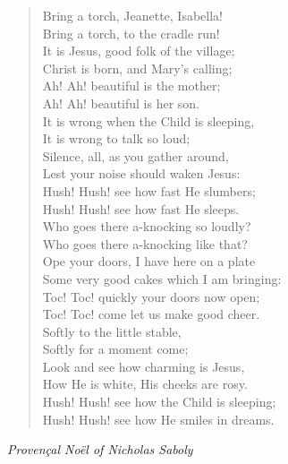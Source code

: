 
\begin{verse}
Bring a torch, Jeanette, Isabella!\\
Bring a torch, to the cradle run!\\
It is Jesus, good folk of the village;\\
Christ is born, and Mary's calling;\\
Ah! Ah! beautiful is the mother;\\
Ah! Ah! beautiful is her son.\\[0.7em]

It is wrong when the Child is sleeping,\\
It is wrong to talk so loud;\\
Silence, all, as you gather around,\\
Lest your noise should waken Jesus:\\
Hush! Hush! see how fast He slumbers;\\
Hush! Hush! see how fast He sleeps.\\[0.7em]

Who goes there a-knocking so loudly?\\
Who goes there a-knocking like that?\\
Ope your doors, I have here on a plate\\
Some very good cakes which I am bringing:\\
Toc! Toc! quickly your doors now open;\\
Toc! Toc! come let us make good cheer.\\[0.7em]

Softly to the little stable,\\
Softly for a moment come;\\
Look and see how charming is Jesus,\\
How He is white, His cheeks are rosy.\\
Hush! Hush! see how the Child is sleeping;\\
Hush! Hush! see how He smiles in dreams.%
\end{verse}

\vspace{0.5\baselineskip}
\noindent\textit{Provençal Noël of Nicholas Saboly}

\newpage
